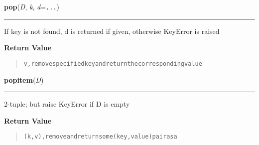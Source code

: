    \label{dict:pop}

    \vspace{0.5ex}

    \begin{boxedminipage}{\textwidth}

    \raggedright \textbf{pop}(\textit{D}, \textit{k}, \textit{d}=\texttt{...})

    \vspace{-1.5ex}

    \rule{\textwidth}{0.5\fboxrule}
    If key is not found, d is returned if given, otherwise KeyError is 
    raised

    \vspace{1ex}

      \textbf{Return Value}
      \begin{quote}
\begin{alltt}
v, remove specified key and return the corresponding value
\end{alltt}

      \end{quote}

    \vspace{1ex}

    \end{boxedminipage}

    \label{dict:popitem}

    \vspace{0.5ex}

    \begin{boxedminipage}{\textwidth}

    \raggedright \textbf{popitem}(\textit{D})

    \vspace{-1.5ex}

    \rule{\textwidth}{0.5\fboxrule}
    2-tuple; but raise KeyError if D is empty

    \vspace{1ex}

      \textbf{Return Value}
      \begin{quote}
\begin{alltt}
(k, v), remove and return some (key, value) pair as a
\end{alltt}

      \end{quote}

    \vspace{1ex}

    \end{boxedminipage}

